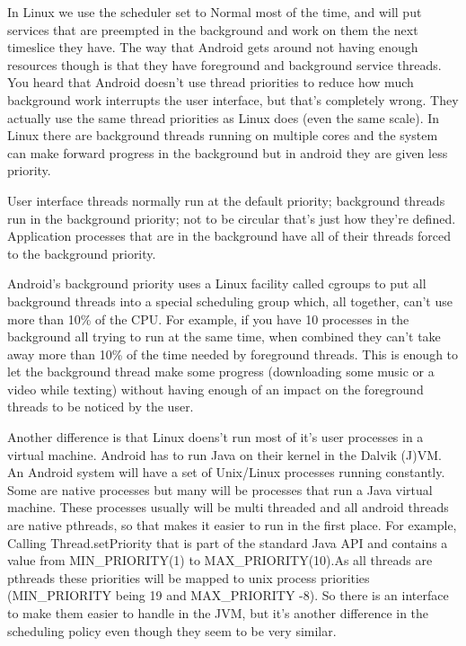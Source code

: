\documentclass[letterpaper,10pt]{article}
\begin{document}
In Linux we use the scheduler set to Normal most of the time, and will put services that are preempted in the background and work on them the next timeslice they have. The way that Android gets around not having enough resources though is that they have foreground and background service threads. You heard that Android doesn’t use thread priorities to reduce how much background work interrupts the user interface, but that's completely wrong. They actually use the same thread priorities as Linux does (even the same scale). In Linux there are background threads running on multiple cores and the system can make forward progress in the background but in android they are given less priority. 

User interface threads normally run at the default priority; background threads run in the background priority; not to be circular that's just how they're defined. Application processes that are in the background have all of their threads forced to the background priority.

Android’s background priority uses a Linux facility called cgroups to put all background threads into a special scheduling group which, all together, can’t use more than 10\% of the CPU. For example, if you have 10 processes in the background all trying to run at the same time, when combined they can't take away more than 10\% of the time needed by foreground threads. This is enough to let the background thread make some progress (downloading some music or a video while texting) without having enough of an impact on the foreground threads to be noticed by the user.

Another difference is that Linux doens't run most of it's user processes in a virtual machine. Android has to run Java on their kernel in the Dalvik (J)VM. An Android system will have a set of Unix/Linux processes running constantly. Some are native processes but many will be processes that run a Java virtual machine. These processes usually will be multi threaded and all android threads are native pthreads, so that makes it easier to run in the first place. For example, Calling Thread.setPriority that is part of the standard Java API and contains a value from MIN\_PRIORITY(1) to MAX\_PRIORITY(10).As all threads are pthreads these priorities will be mapped to unix process priorities (MIN\_PRIORITY being 19 and MAX\_PRIORITY -8). 
So there is an interface to make them easier to handle in the JVM, but it's another difference in the scheduling policy even though they seem to be very similar.
\end{document}

